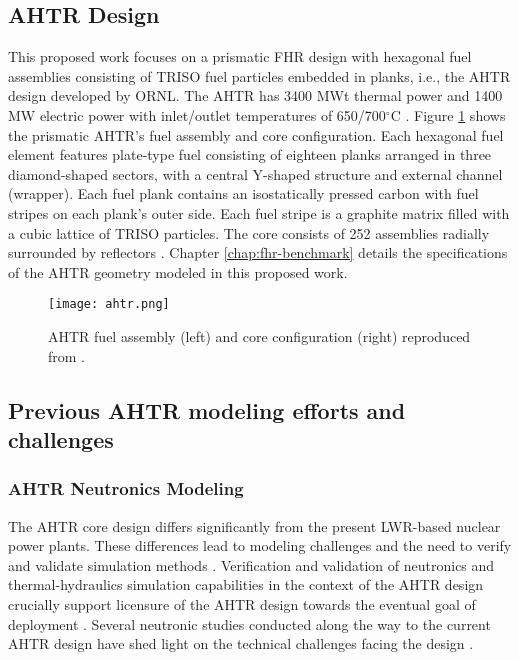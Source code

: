 \subsection{\acrlong{AHTR} Design}
This proposed work focuses on a prismatic \gls{FHR} design with hexagonal fuel assemblies
consisting of \gls{TRISO} fuel particles embedded in planks, i.e., the 
\gls{AHTR} design developed by ORNL. 
The \gls{AHTR} has 3400 MWt thermal power and 1400 MW electric power with
inlet/outlet temperatures of 650/700$^{\circ}$C \cite{varma_ahtr_2012}.  
Figure \ref{fig:ahtr} shows the prismatic AHTR's fuel assembly and core 
configuration.  
Each hexagonal fuel element features plate-type fuel consisting of eighteen planks 
arranged in three diamond-shaped sectors, with a central Y-shaped structure 
and external channel (wrapper).
Each fuel plank contains an isostatically pressed carbon with fuel stripes 
on each plank's outer side.
Each fuel stripe is a graphite matrix filled with a cubic lattice of 
\gls{TRISO} particles. 
The core consists of 252 assemblies radially surrounded by reflectors
\cite{ramey_monte_2018}. 
Chapter \ref{chap:fhr-benchmark} details the specifications of the AHTR geometry
modeled in this proposed work.

\begin{figure}[]
    \centering
    \texttt{[image: ahtr.png]} 
    \caption{\acrlong{AHTR} fuel assembly (left) and core configuration (right) 
    reproduced from \cite{ramey_monte_2018}.}
    \label{fig:ahtr}
\end{figure}

\subsection{Previous AHTR modeling efforts and challenges} 
\label{sec:previous_ahtr}
\subsubsection{AHTR Neutronics Modeling}
The \gls{AHTR} core design differs significantly from the present \gls{LWR}-based 
nuclear power plants. 
These differences lead to modeling challenges and the need to verify and 
validate simulation methods \cite{ramey_monte_2018}. 
Verification and validation of neutronics and thermal-hydraulics simulation 
capabilities in the context of the \gls{AHTR} design crucially 
support licensure of the \gls{AHTR} design towards the eventual goal 
of deployment \cite{rahnema_phenomena_2019,rahnema_current_2015}. 
Several neutronic studies conducted along the way to the current \gls{AHTR} 
design have shed light on the technical challenges facing the design 
\cite{ramey_monte_2018,holcomb_fluoride_2013,greene_pre-conceptual_2010}. 

